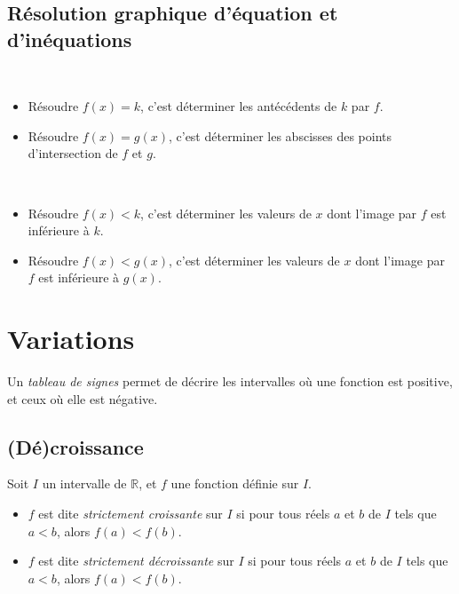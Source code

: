 \subsection{Résolution graphique d'équation et d'inéquations}

\begin{propriete}~
  \begin{itemize}
    \item Résoudre $f(x)=k$, c'est déterminer les antécédents de $k$ par $f$.
    \item Résoudre $f(x)=g(x)$, c'est déterminer les abscisses des points d'intersection de $f$ et $g$.
  \end{itemize}
\end{propriete}

\begin{propriete}~
  \begin{itemize}
    \item Résoudre $f(x)<k$, c'est déterminer les valeurs de $x$ dont l'image par $f$ est inférieure à $k$.
    \item Résoudre $f(x)<g(x)$, c'est déterminer les valeurs de $x$ dont l'image par $f$ est inférieure à $g(x)$.
  \end{itemize}
\end{propriete}

\section{Variations}

\begin{definition}
  Un \emph{tableau de signes} permet de décrire les intervalles où une fonction est positive, et ceux où elle est négative.
\end{definition}

\subsection{(Dé)croissance}

\begin{definition}
  Soit $I$ un intervalle de $\mathbb R$, et $f$ une fonction définie sur $I$.
  \begin{itemize}
    \item $f$ est dite \emph{strictement   croissante} sur $I$ si pour tous
      réels $a$ et $b$ de $I$ tels que $a<b$, alors $f(a)<f(b)$.
    \item $f$ est dite \emph{strictement décroissante} sur $I$ si pour tous
      réels $a$ et $b$ de $I$ tels que $a<b$, alors $f(a)<f(b)$.
  \end{itemize}
\end{definition}

